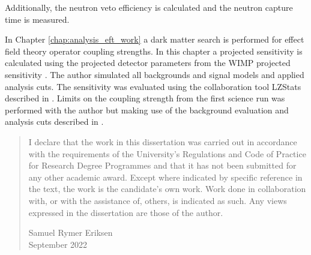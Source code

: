 \begin{SingleSpace}
Additionally, the neutron veto efficiency is calculated and the neutron capture time is measured.
\par
In Chapter \ref{chap:analysis_eft_work} a dark matter search is performed for effect field theory operator coupling strengths.
In this chapter a projected sensitivity is calculated using the projected detector parameters from the WIMP projected sensitivity \cite{LZ_projected_sensitivity_paper_ref}.
The author simulated all backgrounds and signal models and applied analysis cuts.
The sensitivity was evaluated using the collaboration tool LZStats described in \cite{LZ_Ibles_LZStats_Thesis_ref}.
Limits on the coupling strength from the first science run was performed with the author but making use of the background evaluation and analysis cuts described in \cite{lz_ws_sr1_ref}.



\begin{quote}
I declare that the work in this dissertation was carried out in accordance with the requirements of the University's Regulations and Code of Practice for Research Degree Programmes and that it has not been submitted for any other academic award. Except where indicated by specific reference in the text, the work is the candidate's own work. Work done in collaboration with, or with the assistance of, others, is indicated as such. Any views expressed in the dissertation are those of the author.

\begin{flushright}
Samuel Rymer Eriksen \\
September 2022
\end{flushright}

\end{quote}

\end{SingleSpace}
\clearpage